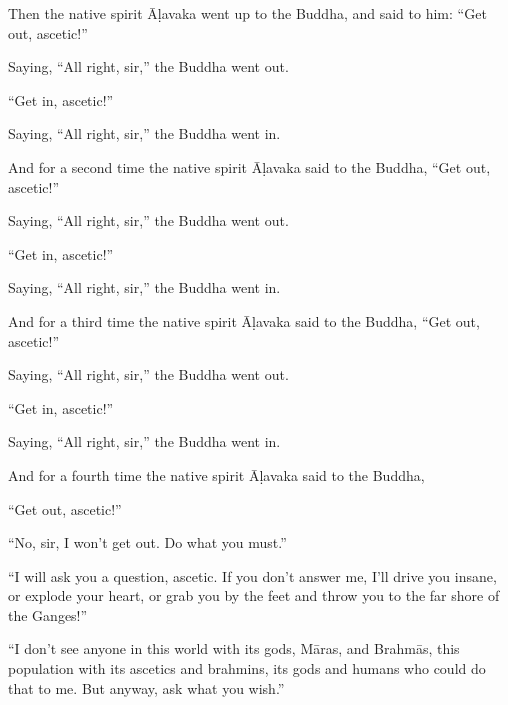 \documentclass[12pt,openany]{book}%
\begin{document}
Then the native spirit \textsanskrit{Āḷavaka} went up to the Buddha, and said to him: “Get out, ascetic!” 

Saying, “All right, sir,” the Buddha went out. 

“Get in, ascetic!” 

Saying, “All right, sir,” the Buddha went in. 

And for a second time the native spirit \textsanskrit{Āḷavaka} said to the Buddha, “Get out, ascetic!” 

Saying, “All right, sir,” the Buddha went out. 

“Get in, ascetic!” 

Saying, “All right, sir,” the Buddha went in. 

And for a third time the native spirit \textsanskrit{Āḷavaka} said to the Buddha, “Get out, ascetic!” 

Saying, “All right, sir,” the Buddha went out. 

“Get in, ascetic!” 

Saying, “All right, sir,” the Buddha went in. 

And for a fourth time the native spirit \textsanskrit{Āḷavaka} said to the Buddha, 

“Get out, ascetic!” 

“No, sir, I won’t get out. Do what you must.” 

“I will ask you a question, ascetic. If you don’t answer me, I’ll drive you insane, or explode your heart, or grab you by the feet and throw you to the far shore of the Ganges!” 

“I don’t see anyone in this world with its gods, \textsanskrit{Māras}, and \textsanskrit{Brahmās}, this population with its ascetics and brahmins, its gods and humans who could do that to me. But anyway, ask what you wish.” 
\end{document}
